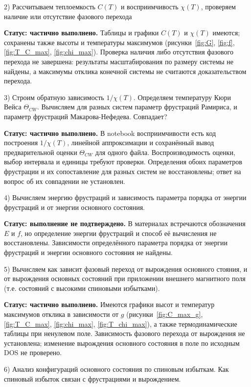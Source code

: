 \documentclass[utf8, babel, sor, jor, amsmath, amssymb, reprint]{elsarticle} %
\begin{document}
2) Рассчитываем теплоемкость $C(T)$ и восприимчивость $\chi(T)$, проверяем наличие или отсутствие фазового перехода

\textbf{Статус: частично выполнено.} Таблицы и графики $C(T)$ и $\chi(T)$ имеются; сохранены также высоты и температуры максимумов (рисунки~\ref{fig:G}, \ref{fig:f}, \ref{fig:T_C_max}, \ref{fig:chi_max}). Проверка наличия либо отсутствия фазового перехода не завершена: результаты масштабирования по размеру системы не найдены, а максимумы отклика конечной системы не считаются доказательством перехода.

3) Строим обратную зависимость  $1/\chi(T)$. Определяем температуру Кюри Вейса $\Theta_{CW}$. Вычисляем для разных систем параметр фрустраций Рамириса, и параметр фрустраций Макарова-Нефедева. Совпадает?

\textbf{Статус: частично выполнено.} В notebook восприимчивости есть код построения $1/\chi(T)$, линейной аппроксимации и сохранённый вывод предварительной оценки $\Theta_{CW}$ для одного файла. Воспроизводимость оценки, выбор интервала и единицы требуют проверки. Определения обоих параметров фрустрации и их сопоставление для разных систем не восстановлены; ответ на вопрос об их совпадении не установлен.

4) Вычисляем энергию фрустраций и зависимость параметра порядка от энергии фрустраций и от энергии основного состояния. 

\textbf{Статус: выполнение не подтверждено.} В материалах встречаются обозначения $E$ и $f$, но определение энергии фрустраций и способ её вычисления не восстановлены. Зависимости определённого параметра порядка от энергии фрустраций и энергии основного состояния не найдены.

5) Вычисляем как зависит фазовый переход от вырождения основного стояния, и от вырождения основных состояний при приложении внешнего магнитного поля (т.е. состояний с высокими спиновыми избытками). 

\textbf{Статус: частично выполнено.} Имеются графики высот и температур максимумов отклика в зависимости от $g$ (рисунки~\ref{fig:C_max_g}, \ref{fig:T_C_max}, \ref{fig:chi_max}, \ref{fig:T_chi_max}), а также термодинамические таблицы при ненулевом поле. Зависимость фазового перехода от вырождения не установлена; изменение вырождения основного состояния в поле по исходным DOS не проверено.

6) Анализ конфигураций основного состояния по спиновым избыткам. Как спиновый избыток связан с фрустрациями и вырождением. 
\end{document}
